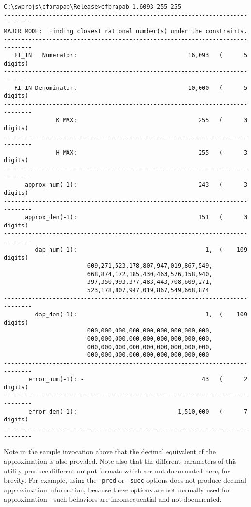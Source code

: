 \begin{dosutilcommandsampleinvocations}
\begin{scriptsize}
\begin{verbatim}
C:\swprojs\cfbrapab\Release>cfbrapab 1.6093 255 255
------------------------------------------------------------------------------
MAJOR MODE:  Finding closest rational number(s) under the constraints.
------------------------------------------------------------------------------
   RI_IN   Numerator:                                16,093   (      5 digits)
------------------------------------------------------------------------------
   RI_IN Denominator:                                10,000   (      5 digits)
------------------------------------------------------------------------------
               K_MAX:                                   255   (      3 digits)
------------------------------------------------------------------------------
               H_MAX:                                   255   (      3 digits)
------------------------------------------------------------------------------
      approx_num(-1):                                   243   (      3 digits)
------------------------------------------------------------------------------
      approx_den(-1):                                   151   (      3 digits)
------------------------------------------------------------------------------
         dap_num(-1):                                     1,  (    109 digits)
                        609,271,523,178,807,947,019,867,549,
                        668,874,172,185,430,463,576,158,940,
                        397,350,993,377,483,443,708,609,271,
                        523,178,807,947,019,867,549,668,874
------------------------------------------------------------------------------
         dap_den(-1):                                     1,  (    109 digits)
                        000,000,000,000,000,000,000,000,000,
                        000,000,000,000,000,000,000,000,000,
                        000,000,000,000,000,000,000,000,000,
                        000,000,000,000,000,000,000,000,000
------------------------------------------------------------------------------
       error_num(-1): -                                  43   (      2 digits)
------------------------------------------------------------------------------
       error_den(-1):                             1,510,000   (      7 digits)
------------------------------------------------------------------------------
\end{verbatim}
\end{scriptsize}

Note in the sample invocation above that the 
decimal equivalent of the approximation is also provided.
Note also that the different parameters of this utility produce
different output formats which are not documented here, for
brevity.  For example, using the \texttt{-pred} or \texttt{-succ}
options does not produce decimal approximation information, because
these options are not normally used for approximation---such
behaviors are inconsequential and not documented.
\end{dosutilcommandsampleinvocations}



